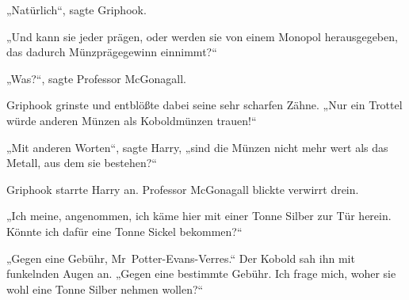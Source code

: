„Natürlich“, sagte Griphook.

„Und kann sie jeder prägen, oder werden sie von einem Monopol herausgegeben, das dadurch Münzprägegewinn einnimmt?“

„Was?“, sagte Professor McGonagall.

Griphook grinste und entblößte dabei seine sehr scharfen Zähne.
„Nur ein Trottel würde anderen Münzen als Koboldmünzen trauen!“

„Mit anderen Worten“, sagte Harry, „sind die Münzen nicht mehr wert als das Metall, aus dem sie bestehen?“

Griphook starrte Harry an. Professor McGonagall blickte verwirrt drein.

„Ich meine, angenommen, ich käme hier mit einer Tonne Silber zur Tür herein. Könnte ich dafür eine Tonne Sickel bekommen?“

„Gegen eine Gebühr, Mr~Potter-Evans-Verres.“ Der Kobold sah ihn mit funkelnden Augen an.
„Gegen eine bestimmte Gebühr. Ich frage mich, woher sie wohl eine Tonne Silber nehmen wollen?“

